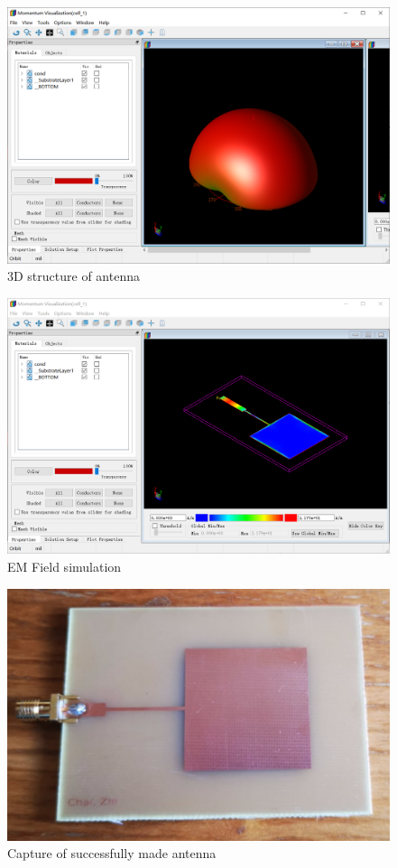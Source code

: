 \documentclass[12pt,a4paper]{report}
\begin{document}
\begin{figure}[H]
    \centerline{\includegraphics[scale=0.3]{FarFieldSimulation.png}}
    \caption{3D structure of antenna}
    \label{fig:3D}
\end{figure}

\begin{figure}[H]
    \centerline{\includegraphics[scale=0.3]{EMSimulation.png}}
    \caption{EM Field simulation}
    \label{fig:EMfield}
\end{figure}

\begin{figure}[ht]
    \centerline{\includegraphics[scale=0.8]{antenna_photo}}
    \caption{Capture of successfully made antenna}
    \label{fig:antenna_photo}
\end{figure}
\end{document}
